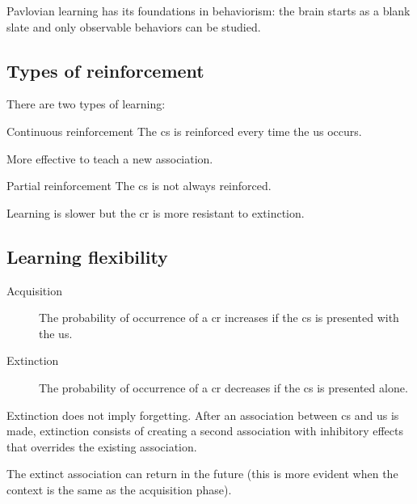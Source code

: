 \begin{remark}
    Pavlovian learning has its foundations in behaviorism: the brain starts as a blank slate and only observable behaviors can be studied.
\end{remark}


\subsection{Types of reinforcement}

There are two types of learning:
\begin{descriptionlist}
    \item[Continuous reinforcement] 
        The \acl{cs} is reinforced every time the \acl{us} occurs.
        \begin{remark}
            More effective to teach a new association.
        \end{remark}

    \item[Partial reinforcement] 
        The \acl{cs} is not always reinforced.
        \begin{remark}
            Learning is slower but the \acl{cr} is more resistant to extinction.
        \end{remark}
\end{descriptionlist}


\subsection{Learning flexibility}

\begin{description}
    \item[Acquisition] 
        The probability of occurrence of a \acl{cr} increases if the \acl{cs} is presented with the \acl{us}.
        
    \item[Extinction] 
        The probability of occurrence of a \acl{cr} decreases if the \acl{cs} is presented alone.
\end{description}

\begin{remark}
    Extinction does not imply forgetting.
    After an association between \ac{cs} and \ac{us} is made, 
    extinction consists of creating a second association with inhibitory effects that overrides the existing association.

    The extinct association can return in the future
    (this is more evident when the context is the same as the acquisition phase).
\end{remark}


